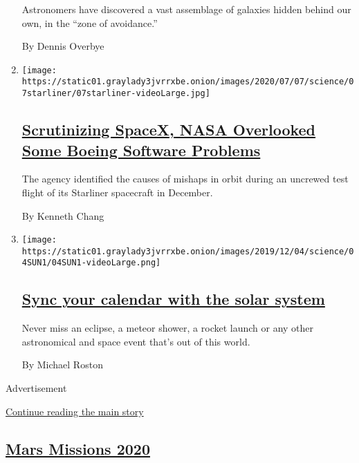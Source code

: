 \begin{enumerate}
  Astronomers have discovered a vast assemblage of galaxies hidden
  behind our own, in the ``zone of avoidance.''

  By Dennis Overbye
\item
  \texttt{[image: https://static01.graylady3jvrrxbe.onion/images/2020/07/07/science/07starliner/07starliner-videoLarge.jpg]}

  \hypertarget{scrutinizing-spacex-nasa-overlooked-some-boeing-software-problems}{%
  \subsection{\texorpdfstring{\href{/2020/07/07/science/boeing-starliner-nasa.html}{Scrutinizing
  SpaceX, NASA Overlooked Some Boeing Software
  Problems}}{Scrutinizing SpaceX, NASA Overlooked Some Boeing Software Problems}}\label{scrutinizing-spacex-nasa-overlooked-some-boeing-software-problems}}

  The agency identified the causes of mishaps in orbit during an
  uncrewed test flight of its Starliner spacecraft in December.

  By Kenneth Chang
\item
  \texttt{[image: https://static01.graylady3jvrrxbe.onion/images/2019/12/04/science/04SUN1/04SUN1-videoLarge.png]}

  \hypertarget{sync-your-calendar-with-the-solar-system}{%
  \subsection{\texorpdfstring{\href{/interactive/2020/science/2020-astronomy-space-calendar.html}{Sync
  your calendar with the solar
  system}}{Sync your calendar with the solar system}}\label{sync-your-calendar-with-the-solar-system}}

  Never miss an eclipse, a meteor shower, a rocket launch or any other
  astronomical and space event that's out of this world.

  By Michael Roston
\end{enumerate}

Advertisement

\protect\hyperlink{after-mid1}{Continue reading the main story}

\hypertarget{mars-missions-2020}{%
\subsection{\texorpdfstring{\href{/news-event/summer-of-mars}{Mars
Missions 2020}}{Mars Missions 2020}}\label{mars-missions-2020}}

